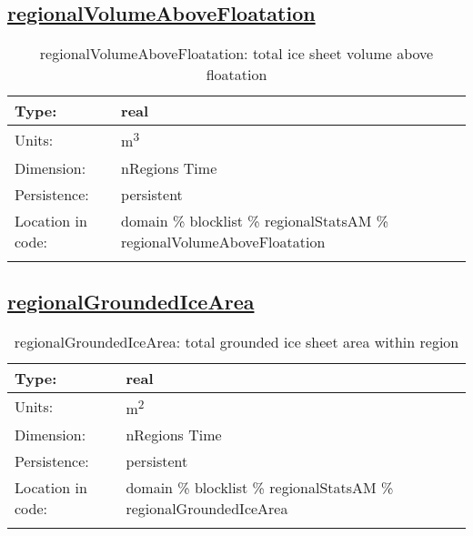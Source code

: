 \subsection[regionalVolumeAboveFloatation]{\hyperref[sec:var_tab_regionalStatsAM]{regionalVolumeAboveFloatation}}
\label{subsec:var_sec_regionalStatsAM_regionalVolumeAboveFloatation}
\begin{center}
\begin{longtable}{| p{2.0in} | p{4.0in} |}
        \hline 
        Type: & real \\
        \hline 
        Units: & \si{m^3} \\
        \hline 
        Dimension: & nRegions Time \\
        \hline 
        Persistence: & persistent \\
        \hline 
         Location in code: & domain \% blocklist \% regionalStatsAM \% regionalVolumeAboveFloatation \\
         \hline 
    \caption{regionalVolumeAboveFloatation: total ice sheet volume above floatation}
\end{longtable}
\end{center}
\subsection[regionalGroundedIceArea]{\hyperref[sec:var_tab_regionalStatsAM]{regionalGroundedIceArea}}
\label{subsec:var_sec_regionalStatsAM_regionalGroundedIceArea}
\begin{center}
\begin{longtable}{| p{2.0in} | p{4.0in} |}
        \hline 
        Type: & real \\
        \hline 
        Units: & \si{m^2} \\
        \hline 
        Dimension: & nRegions Time \\
        \hline 
        Persistence: & persistent \\
        \hline 
         Location in code: & domain \% blocklist \% regionalStatsAM \% regionalGroundedIceArea \\
         \hline 
    \caption{regionalGroundedIceArea: total grounded ice sheet area within region}
\end{longtable}
\end{center}
